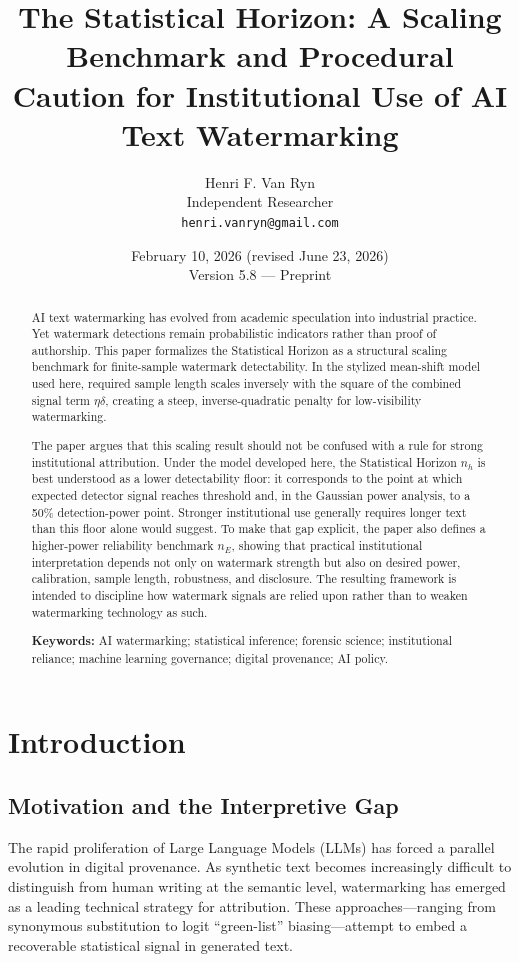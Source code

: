 \documentclass[11pt]{article}
\title{The Statistical Horizon: A Scaling Benchmark and Procedural
Caution for Institutional Use of AI Text Watermarking}
\author{Henri F. Van Ryn\\
Independent Researcher\\
\texttt{henri.vanryn@gmail.com}}
\date{February 10, 2026 (revised June 23, 2026)\\Version 5.8 --- Preprint}
\begin{document}
\maketitle

\begin{abstract}
AI text watermarking has evolved from academic speculation into industrial
practice. Yet watermark detections remain probabilistic indicators rather than
proof of authorship. This paper formalizes the Statistical Horizon as a
structural scaling benchmark for finite-sample watermark detectability. In the
stylized mean-shift model used here, required sample length scales inversely with
the square of the combined signal term $\eta\delta$, creating a steep,
inverse-quadratic penalty for low-visibility watermarking.

The paper argues that this scaling result should not be confused with a rule for
strong institutional attribution. Under the model developed here, the Statistical
Horizon $n_h$ is best understood as a lower detectability floor: it corresponds to
the point at which expected detector signal reaches threshold and, in the Gaussian
power analysis, to a 50\% detection-power point. Stronger institutional use
generally requires longer text than this floor alone would suggest. To make that
gap explicit, the paper also defines a higher-power reliability benchmark $n_E$,
showing that practical institutional interpretation depends not only on watermark
strength but also on desired power, calibration, sample length, robustness, and
disclosure. The resulting framework is intended to discipline how watermark
signals are relied upon rather than to weaken watermarking technology as such.

\medskip
\noindent\textbf{Keywords:} AI watermarking; statistical inference; forensic
science; institutional reliance; machine learning governance; digital provenance;
AI policy.
\end{abstract}

\section{Introduction}

\subsection{Motivation and the Interpretive Gap}

The rapid proliferation of Large Language Models (LLMs) has forced a parallel
evolution in digital provenance. As synthetic text becomes increasingly difficult
to distinguish from human writing at the semantic level, watermarking has emerged
as a leading technical strategy for attribution. These approaches---ranging from
synonymous substitution to logit ``green-list'' biasing---attempt to embed a
recoverable statistical signal in generated text.
\end{document}
